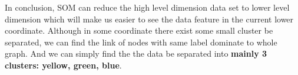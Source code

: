 \documentclass[titlepage,a4paper,12pt,thmsb]{report}
\begin{document}
\begin{center}
\begin{figure}[h]
{\par}
\end{figure}
{}
\end{center}
\newpage
\begin{center}
\begin{figure}[h]
{\par}
\end{figure}
{}
\end{center}

In conclusion, SOM can reduce the high level dimension data set to lower level dimension which will make us easier to see the data feature in the current lower coordinate. Although in some coordinate there exist some small cluster be separated,  we can find the link of nodes with same label dominate to whole graph.  And we can simply find the the data be separated into {\bf mainly 3 clusters: yellow, green, blue}.
\end{document}
